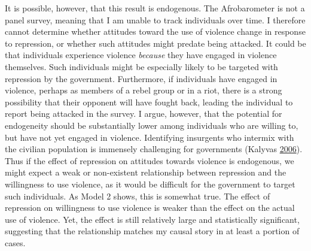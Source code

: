 \documentclass[12pt,]{book}
\theoremstyle{definition}
\theoremstyle{definition}
\theoremstyle{definition}
\theoremstyle{remark}
\begin{document}
It is possible, however, that this result is endogenous. The
Afrobarometer is not a panel survey, meaning that I am unable to track
individuals over time. I therefore cannot determine whether attitudes
toward the use of violence change in response to repression, or whether
such attitudes might predate being attacked. It could be that
individuals experience violence \emph{because} they have engaged in
violence themselves. Such individuals might be especially likely to be
targeted with repression by the government. Furthermore, if individuals
have engaged in violence, perhaps as members of a rebel group or in a
riot, there is a strong possibility that their opponent will have fought
back, leading the individual to report being attacked in the survey. I
argue, however, that the potential for endogeneity should be
substantially lower among individuals who are willing to, but have not
yet engaged in violence. Identifying insurgents who intermix with the
civilian population is immensely challenging for governments (Kalyvas
\protect\hyperlink{ref-Kalyvas2006}{2006}). Thus if the effect of
repression on attitudes towards violence is endogenous, we might expect
a weak or non-existent relationship between repression and the
willingness to use violence, as it would be difficult for the government
to target such individuals. As Model 2 shows, this is somewhat true. The
effect of repression on willingness to use violence is weaker than the
effect on the actual use of violence. Yet, the effect is still
relatively large and statistically significant, suggesting that the
relationship matches my causal story in at least a portion of cases.
\end{document}
